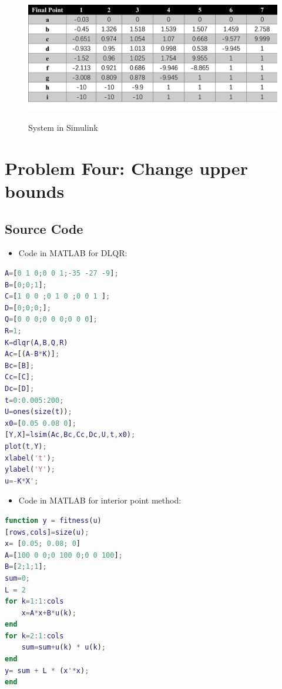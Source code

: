 \documentclass{mcmthesis}
\begin{document}
\begin{figure}[H]%
  \centering
  \caption{System in Simulink}
  \includegraphics[width=50ex]{Optimal Control of a Linear Discrete System/MCM20200128/picture/changeA/表格.png} %
  \label{Fig.RNN} %
\end{figure}


\section{Problem Four: Change upper bounds}






\begin{appendices}

\section{ Source Code}
\begin{itemize}
\item Code in MATLAB for DLQR:
\end{itemize}
\begin{lstlisting}[language=MATLAB, caption=LQR in MATLAB]
A=[0 1 0;0 0 1;-35 -27 -9];
B=[0;0;1];
C=[1 0 0 ;0 1 0 ;0 0 1 ];
D=[0;0;0;];
Q=[0 0 0;0 0 0;0 0 0];
R=1;
K=dlqr(A,B,Q,R)
Ac=[(A-B*K)];
Bc=[B];
Cc=[C];
Dc=[D];
t=0:0.005:200;
U=ones(size(t));
x0=[0.05 0.08 0];
[Y,X]=lsim(Ac,Bc,Cc,Dc,U,t,x0);
plot(t,Y);
xlabel('t');
ylabel('Y');
u=-K*X';
\end{lstlisting}
\begin{itemize}
\item Code in MATLAB for interior point method:
\end{itemize}

\begin{lstlisting}[language=MATLAB, caption=Function for interior point method]
function y = fitness(u)
[rows,cols]=size(u);
x= [0.05; 0.08; 0]
A=[100 0 0;0 100 0;0 0 100];
B=[2;1;1];
sum=0;
L = 2
for k=1:1:cols
    x=A*x+B*u(k);
end
for k=2:1:cols
    sum=sum+u(k) * u(k);
end
y= sum + L * (x'*x);
end
\end{lstlisting}


\end{appendices}
\end{document}
